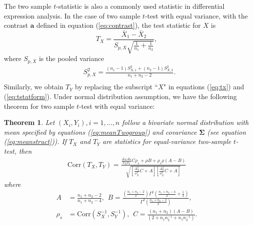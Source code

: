 \documentclass[12pt, a4paper]{article}
\newtheorem{theorem}{Theorem}       %
\newcommand{\cor}{\text{Corr}}
\begin{document}
	The two sample $t$-statistic is also a commonly used statistic in differential expression 
	analysis.	In the case of two sample $t$-test with equal variance, with the contrast $\bm a$ 
	defined in equation (\ref{eq:contrast}), the test statistic for $X$ is 
	\begin{equation}\label{eq:tx}
		T_X= \frac{\bar{X}_1- \bar{X}_2}{S_{p, X}\sqrt{\frac{1}{n_1} + \frac{1}{n_2}}},
	\end{equation}
	where $S_{p, X}$ is the pooled variance
	 \begin{equation}\label{eq:tstatform}
	 \begin{aligned}
	 &S_{p, X}^2 = \frac{(n_1-1)S_{X, 1}^2 + (n_2 -1)S_{X,2}^2}{n_1 + n_2 -2}. \\
	 \end{aligned}
	 \end{equation}
 Similarly, we obtain $T_Y$ by replacing the subscript ``$X$" in equations (\ref{eq:tx}) and (\ref{eq:tstatform}). Under normal distribution assumption, we have the following theorem for two sample $t$-test with equal variance:
	\begin{theorem}\label{thm:tstat}
		Let $(X_i, Y_i), i = 1, \ldots, n$ follow a bivariate normal distribution with mean 
		specified by equations (\ref{eq:meanTwogroup}) and covariance $\bm \Sigma$ (see equation 
		(\ref{eq:meanstruct})). If $T_X$ and $T_Y$ are statistics for equal-variance two-sample 
		$t$-test, then 
		\begin{equation}\label{eq:ttestcor}
	\begin{aligned}
	 \cor(T_X, T_Y) =   
	 \frac{\frac{\Delta_X\Delta_Y}{\sigma_X\sigma_Y}C \rho_{s}+ \rho B
		+ \rho_{s}\rho(A-B)}{\sqrt{\left[ \frac{\Delta_X^2}{\sigma_X^2}C + A\right]\left[\frac{\Delta_Y^2}{\sigma_X^2}C +   A\right]}}
	\end{aligned}
		\end{equation}
	where 
			 \begin{equation}\label{eq:AandB}
			 	 \begin{aligned}
			 	 A & = \frac{n_1 + n_2-2}{n_1 + n_2-4}, ~~B =
			 	 \frac{(\frac{n_1 + n_2 -2}{2})\Gamma^2(\frac{n_1 + n_2 -4}{2} + \frac{1}{2})}{\Gamma^2(\frac{n_1+ n_2 -2}{2})}, \\
			 	 \rho_s & = \cor(S_X^{-1}, S_Y^{-1}), ~~ 
			 	 C = \frac{(n_1 + n_2)(A-B)}{(2 + n_1n_2^{-1} + n_1n_2^{-1})}.
			 	 \end{aligned}
			 \end{equation}	 
	\end{theorem}
\end{document}
